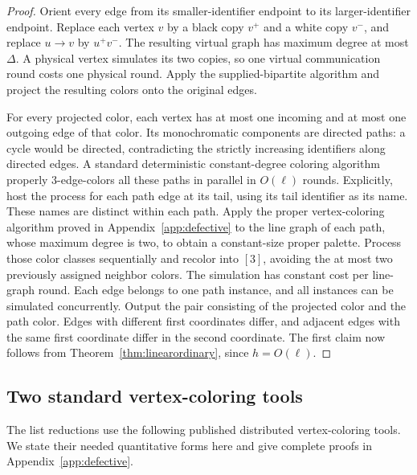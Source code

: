 \documentclass[11pt]{article}
\theoremstyle{definition}
\theoremstyle{remark}
\begin{document}
\begin{proof}
Orient every edge from its smaller-identifier endpoint to its
larger-identifier endpoint.  Replace each vertex $v$ by a black copy
$v^+$ and a white copy $v^-$, and replace $u\to v$ by $u^+v^-$.  The
resulting virtual graph has maximum degree at most $\Delta$.  A physical
vertex simulates its two copies, so one virtual communication round costs
one physical round.  Apply the supplied-bipartite algorithm and project
the resulting colors onto the original edges.

For every projected color, each vertex has at most one incoming and at
most one outgoing edge of that color.  Its monochromatic components are
directed paths: a cycle would be directed, contradicting the strictly
increasing identifiers along directed edges.  A standard deterministic
constant-degree coloring algorithm properly $3$-edge-colors all these
paths in parallel in $O(\ell)$ rounds. Explicitly, host the process for
each path edge at its tail, using its tail identifier as its name. These
names are distinct within each path. Apply the proper vertex-coloring
algorithm proved in Appendix~\ref{app:defective} to the line graph of
each path, whose maximum degree is two, to obtain a constant-size
proper palette. Process those color classes sequentially and recolor
into $[3]$, avoiding the at most two previously assigned neighbor
colors. The simulation has constant cost per line-graph round.  Each edge belongs to one path instance,
and all instances can be simulated concurrently.  Output the pair
consisting of the projected color and the path color.  Edges with
different first coordinates differ, and adjacent edges with the same
first coordinate differ in the second coordinate.  The first claim now
follows from Theorem~\ref{thm:linearordinary}, since $h=O(\ell)$.
\end{proof}

\subsection{Two standard vertex-coloring tools}

The list reductions use the following published distributed
vertex-coloring tools. We state their needed quantitative forms here and give complete proofs in Appendix~\ref{app:defective}.
\end{document}
